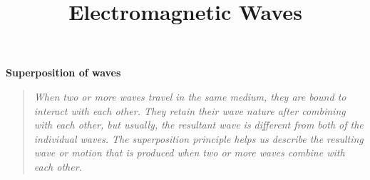 \documentclass[11pt]{article}
\title{Electromagnetic Waves}
\begin{document}
\maketitle

% 




    
\begin{center}
    \textbf{Superposition of waves}
    \begin{quote}
        \textit{When two or more waves travel in the same medium, they are bound to interact with each other. They retain their wave nature after combining with each other, but usually, the resultant wave is different from both of the individual waves. The superposition principle helps us describe the resulting wave or motion that is produced when two or more waves combine with each other.}
    \end{quote}
\end{center}
    
\end{document}

